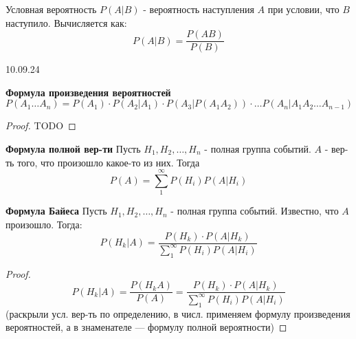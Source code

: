     \begin{opr}
        Условная вероятность \(P(A|B)\) - вероятность наступления \(A\) при условии, 
        что \(B\) наступило. Вычисляется как:
        \begin{equation}
            P(A|B) = \frac{P(AB)}{P(B)}
        \end{equation}
    \end{opr}


    \vspace{2cm}
    \begin{center}\large{10.09.24}\end{center}
    \begin{thm}
        \textbf{Формула произведения вероятностей}
        \begin{equation}
            P(A_{1}\dots A_{n}) = 
            P(A_{1})\cdot 
            P(A_{2}|A_{1})\cdot 
            P(A_{3} | P(A_{1} A_{2}))\cdot
            \dots
            P(A_{n} | A_{1}A_{2}\dots A_{n - 1})
        \end{equation}

        \begin{proof}
            TODO
        \end{proof}
    \end{thm}

    \begin{thm}
        \textbf{Формула полной вер-ти}
        Пусть \(H_{1}, H_{2}, \dots, H_{n}\) - полная группа событий. 
        \(A\) - вер-ть того, что произошло какое-то из них. Тогда
        \begin{equation}
            P(A) = \sum_{1}^{\infty} P(H_{i}) P(A|H_{i})
        \end{equation}
    \end{thm}


    \begin{thm}
        \textbf{Формула Байеса}
        Пусть \(H_{1}, H_{2}, \dots, H_{n}\) - полная группа событий. 
        Известно, что \(A\) произошло. Тогда:
        \begin{equation}
            P(H_{k} | A) = \frac{P(H_{k})\cdot P(A|H_{k})}{\sum_{1}^{\infty} P(H_{i}) P(A|H_{i})}
        \end{equation}
        \begin{proof}
            \begin{equation}
                P(H_{k} | A) = \frac{P(H_{k} A)}{P(A)} 
                = \frac{P(H_{k})\cdot P(A|H_{k})}{\sum_{1}^{\infty} P(H_{i}) P(A|H_{i})}
            \end{equation}
            (раскрыли усл. вер-ть по определению, в числ. применяем формулу произведения
            вероятностей, а в знаменателе — формулу полной вероятности)
        \end{proof}
    \end{thm}

